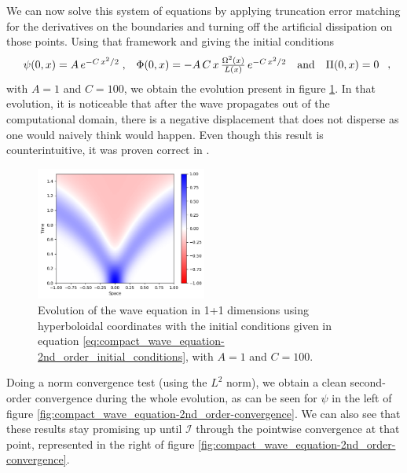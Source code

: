We can now solve this system of equations by applying truncation error matching for the derivatives on the boundaries and turning off the artificial dissipation on those points. Using that framework and giving the initial conditions
\begin{equation}
    \begin{array}{c c c c}
        \psi(0,x) = A \, e^{-C \, x^2/2} \; , & \Phi(0,x) = - A \,C \, x \, \frac{\Omega^2(x)}{L(x)} \, e^{-C \, x^2/2} & \text{and} & \Pi(0,x) = 0
    \end{array} \; ,
    \label{eq:compact_wave_equation-2nd_order_initial_conditions}
\end{equation}
with $A = 1$ and $C = 100$, we obtain the evolution present in figure \ref{fig:compact_wave_equation-2nd_order}. In that evolution, it is noticeable that after the wave propagates out of the computational domain, there is a negative displacement that does not disperse as one would naively think would happen. Even though this result is counterintuitive, it was proven correct in \cite{Valiente_Kroon_2024}.

\begin{figure}[h]
    \centering
    \includegraphics[width=0.5\textwidth]{Images/Wave_Equation_1+1-Solution.png}
    \caption{Evolution of the wave equation in 1+1 dimensions using hyperboloidal coordinates with the initial conditions given in equation \eqref{eq:compact_wave_equation-2nd_order_initial_conditions}, with $A = 1$ and $C = 100$.}
    \label{fig:compact_wave_equation-2nd_order}
\end{figure}

Doing a norm convergence test (using the $L^2$ norm), we obtain a clean second-order convergence during the whole evolution, as can be seen for $\psi$ in the left of figure \ref{fig:compact_wave_equation-2nd_order-convergence}. We can also see that these results stay promising up until $\mathscr{I}$ through the pointwise convergence at that point, represented in the right of figure \ref{fig:compact_wave_equation-2nd_order-convergence}.


